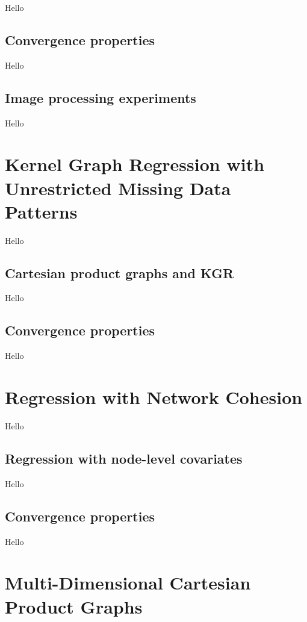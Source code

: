 Hello

\subsection{Convergence properties}

Hello

\subsection{Image processing experiments}

Hello



\section{Kernel Graph Regression with Unrestricted Missing Data Patterns}

\label{sec:kgr_mdp}

Hello

\subsection{Cartesian product graphs and KGR}

Hello

\subsection{Convergence properties}

Hello


\section{Regression with Network Cohesion}

\label{sec:rnc_mdp}

Hello

\subsection{Regression with node-level covariates}

Hello

\subsection{Convergence properties}

Hello


\section{Multi-Dimensional Cartesian Product Graphs}

